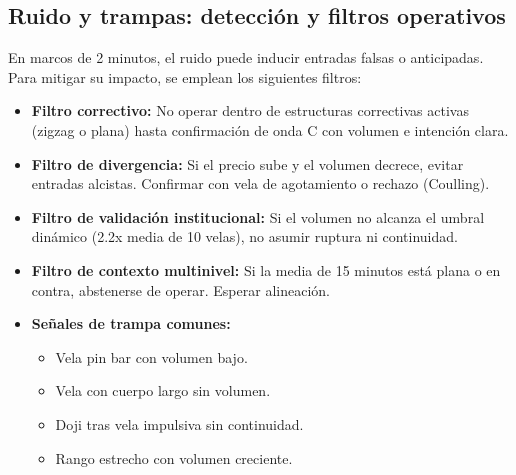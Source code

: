 \vspace{2em}

\subsection*{Ruido y trampas: detecci\'on y filtros operativos}

En marcos de 2 minutos, el ruido puede inducir entradas falsas o anticipadas. Para mitigar su impacto, se emplean los siguientes filtros:

\begin{itemize}
    \item \textbf{Filtro correctivo:} No operar dentro de estructuras correctivas activas (zigzag o plana) hasta confirmaci\'on de onda C con volumen e intenci\'on clara.

    \item \textbf{Filtro de divergencia:} Si el precio sube y el volumen decrece, evitar entradas alcistas. Confirmar con vela de agotamiento o rechazo (Coulling).

    \item \textbf{Filtro de validaci\'on institucional:} Si el volumen no alcanza el umbral din\'amico (2.2x media de 10 velas), no asumir ruptura ni continuidad.

    \item \textbf{Filtro de contexto multinivel:} Si la media de 15 minutos est\'a plana o en contra, abstenerse de operar. Esperar alineaci\'on.

    \item \textbf{Se\~nales de trampa comunes:}
    \begin{itemize}
        \item Vela pin bar con volumen bajo.
        \item Vela con cuerpo largo sin volumen.
        \item Doji tras vela impulsiva sin continuidad.
        \item Rango estrecho con volumen creciente.
    \end{itemize}
\end{itemize}
